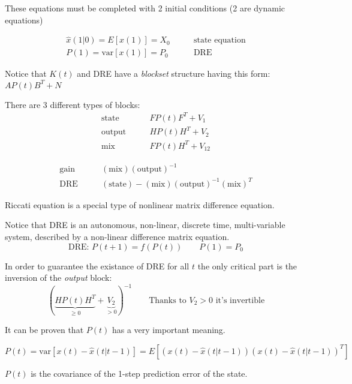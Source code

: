 These equations must be completed with 2 initial conditions (2 are dynamic equations)

\begin{align*}
    \hat{x}(1|0) = E[x(1)] = X_0 & \qquad\text{state equation} \\
    P(1) = \text{var}[x(1)] = P_0 & \qquad\text{DRE}
\end{align*}

\begin{remark}
    Notice that $K(t)$ and DRE have  a \emph{blockset} structure having this form: $AP(t)B^T+N$

    There are 3 different types of blocks:
    \begin{align*}
        \text{state} \qquad& FP(t)F^T+V_1 \\
        \text{output} \qquad& HP(t)H^T+V_2 \\
        \text{mix} \qquad& FP(t)H^T+V_{12}
    \end{align*}

    \begin{align*}
        \text{gain} \qquad& (\text{mix})(\text{output})^{-1} \\
        \text{DRE} \qquad& (\text{state}) - (\text{mix})(\text{output})^{-1}(\text{mix})^T
    \end{align*}
\end{remark}

\begin{remark}
    Riccati equation is a special type of nonlinear matrix difference equation.

    Notice that DRE is an autonomous, non-linear, discrete time, multi-variable system, described by a non-linear difference matrix equation.
    \[
        \text{DRE: } P(t+1) = f(P(t)) \qquad P(1) = P_0
    \]
\end{remark}

\begin{remark}
    In order to guarantee the existance of DRE for all $t$ the only critical part is the inversion of the \emph{output} block:
    \[
        ( \underbrace{HP(t)H^T}_{\ge 0} + \underbrace{V_2}_{>0})^{-1} \qquad \text{Thanks to $V_2>0$ it's invertible}
    \]
\end{remark}

\begin{remark}[Meaning of $P(t)$]
    It can be proven that $P(t)$ has a very important meaning.

    \[
        P(t) = \text{var}[x(t) - \hat{x}(t|t-1)] = E[(x(t) - \hat{x}(t|t-1))(x(t) - \hat{x}(t|t-1))^T]
    \]

    $P(t)$ is the covariance of the 1-step prediction error of the state.
\end{remark}
